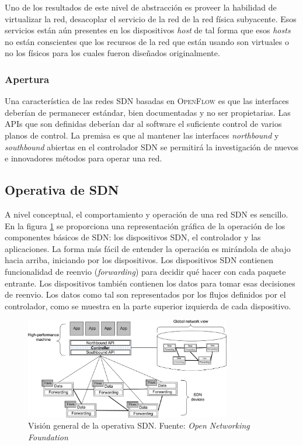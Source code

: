 \documentclass[10pt,journal,compsoc]{IEEEtran}
\begin{document}
Uno de los resultados de este nivel de abstracción es proveer la habilidad de virtualizar la red, desacoplar el servicio de la red de la red física subyacente. Esos servicios están aún presentes en los dispositivos \emph{host} de tal forma que esos \emph{hosts} no están conscientes que los recursos de la red que están usando son virtuales o no los físicos para los cuales fueron diseñados originalmente.

\subsubsection{Apertura}
Una característica de las redes SDN basadas en \textsc{OpenFlow} es que las interfaces deberían de permanecer estándar, bien documentadas y no ser propietarias. Las APIs que son definidas deberían dar al software el suficiente control de varios planos de control. La premisa es que al mantener las interfaces \emph{northbound} y \emph{southbound} abiertas en el controlador SDN se permitirá la investigación de nuevos e innovadores métodos para operar una red.

\subsection{Operativa de SDN}
A nivel conceptual, el comportamiento y operación de una red SDN es sencillo. En la figura \ref{fig:operation-sdn} se proporciona una representación gráfica de la operación de los componentes básicos de SDN: los dispositivos SDN, el controlador y las aplicaciones. La forma más fácil de entender la operación es mirándola de abajo hacia arriba, iniciando por los dispositivos. Los dispositivos SDN contienen funcionalidad de reenvio (\emph{forwarding}) para decidir qué hacer con cada paquete entrante. Los dispositivos también contienen los datos para tomar esas decisiones de reenvio. Los datos como tal son representados por los flujos definidos por el controlador, como se muestra en la parte superior izquierda de cada dispositivo.

\begin{figure}[h]
    \centering
    \includegraphics[width=9cm]{operation-sdn}
    \caption{Visión general de la operativa SDN. Fuente: \emph{Open Networking Foundation}}
    \label{fig:operation-sdn}
\end{figure}
\end{document}
